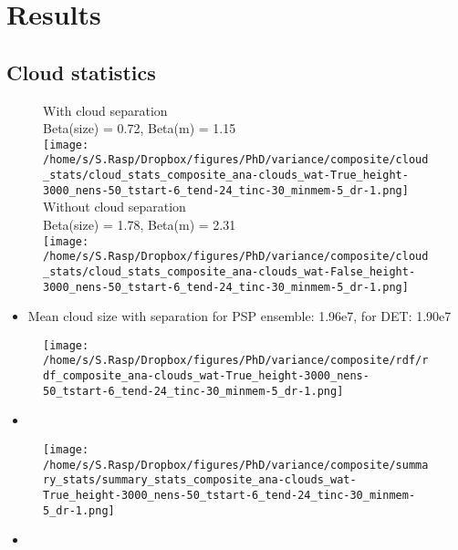 \documentclass[a4paper, 12pt]{article}
\begin{document}
\newpage


\section{Results}

\subsection{Cloud statistics}
\begin{figure}[h!]
\noindent \centering
With cloud separation\\
Beta(size) = 0.72, Beta(m) = 1.15\\
\texttt{[image: /home/s/S.Rasp/Dropbox/figures/PhD/variance/composite/cloud\_stats/cloud\_stats\_composite\_ana-clouds\_wat-True\_height-3000\_nens-50\_tstart-6\_tend-24\_tinc-30\_minmem-5\_dr-1.png]}
Without cloud separation\\
Beta(size) = 1.78, Beta(m) = 2.31\\
\texttt{[image: /home/s/S.Rasp/Dropbox/figures/PhD/variance/composite/cloud\_stats/cloud\_stats\_composite\_ana-clouds\_wat-False\_height-3000\_nens-50\_tstart-6\_tend-24\_tinc-30\_minmem-5\_dr-1.png]}
\caption{}
\end{figure}
\begin{itemize}
 \item Mean cloud size with separation for PSP ensemble: 1.96e7, for DET: 1.90e7
\end{itemize}
\newpage



\begin{figure}[h!]
\noindent \centering
\texttt{[image: /home/s/S.Rasp/Dropbox/figures/PhD/variance/composite/rdf/rdf\_composite\_ana-clouds\_wat-True\_height-3000\_nens-50\_tstart-6\_tend-24\_tinc-30\_minmem-5\_dr-1.png]}
\end{figure}
\begin{itemize}
 \item 
\end{itemize}
\newpage

\begin{figure}[h!]
\noindent \centering
\texttt{[image: /home/s/S.Rasp/Dropbox/figures/PhD/variance/composite/summary\_stats/summary\_stats\_composite\_ana-clouds\_wat-True\_height-3000\_nens-50\_tstart-6\_tend-24\_tinc-30\_minmem-5\_dr-1.png]}
\end{figure}
\begin{itemize}
 \item 
\end{itemize}
\newpage
\end{document}
